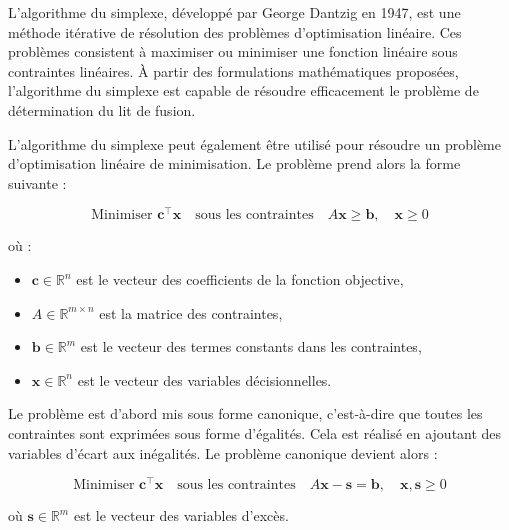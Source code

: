 \documentclass[12pt]{article}
\begin{document}
L'algorithme du simplexe, développé par George Dantzig en 1947, est une 
méthode itérative de résolution des problèmes d'optimisation linéaire. 
Ces problèmes consistent à maximiser ou minimiser une fonction linéaire 
sous contraintes linéaires. À partir des formulations mathématiques 
proposées, l'algorithme du simplexe est capable de résoudre efficacement 
le problème de détermination du lit de fusion.





L'algorithme du simplexe peut également être utilisé pour résoudre un 
problème d'optimisation linéaire de minimisation. Le problème prend alors 
la forme suivante :

\[
\text{Minimiser } \mathbf{c}^\top \mathbf{x} \quad \text{sous les contraintes} \quad A\mathbf{x} \geq \mathbf{b}, \quad \mathbf{x} \geq 0
\]

où :
\begin{itemize}
    \item \(\mathbf{c} \in \mathbb{R}^n\) est le vecteur des 
    coefficients de la fonction objective,
    \item \(A \in \mathbb{R}^{m \times n}\) est la matrice des contraintes,
    \item \(\mathbf{b} \in \mathbb{R}^m\) est le vecteur des termes 
    constants dans les contraintes,
    \item \(\mathbf{x} \in \mathbb{R}^n\) est le vecteur des variables 
    décisionnelles.
\end{itemize}


Le problème est d'abord mis sous forme canonique, c'est-à-dire que toutes 
les contraintes sont exprimées sous forme d'égalités. Cela est 
réalisé en ajoutant des variables d'écart aux inégalités. 
Le problème canonique devient alors :

\[
\text{Minimiser } \mathbf{c}^\top \mathbf{x} \quad \text{sous les contraintes} \quad A\mathbf{x} - \mathbf{s} = \mathbf{b}, \quad \mathbf{x}, \mathbf{s} \geq 0
\]

où \(\mathbf{s} \in \mathbb{R}^m\) est le vecteur des variables d'excès.
\end{document}
